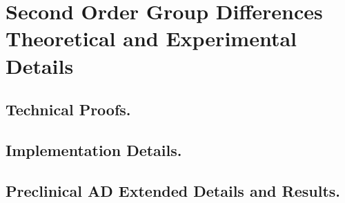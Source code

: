 
\chapter{Second Order Group Differences Theoretical and Experimental Details}
\section{Technical Proofs.}

\section{Implementation Details.}


\section{Preclinical AD Extended Details and Results.}




%
%
%
%
%

%
%
%
%
%
%
%
%
% 
%